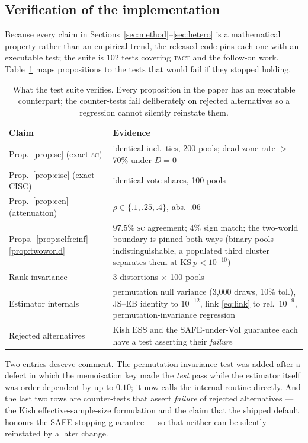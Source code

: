 \documentclass[twoside,11pt]{article}
\newcommand{\SC}{\textsc{sc}}
\newcommand{\TACT}{\textsc{tact}}
\begin{document}
\subsection{Verification of the implementation}\label{sec:tests}
Because every claim in Sections~\ref{sec:method}--\ref{sec:hetero} is a
mathematical property rather than an empirical trend, the released code pins
each one with an executable test; the suite is 102 tests covering \TACT{} and the
follow-on work. Table~\ref{tab:tests}
maps propositions to the tests that would fail if they stopped holding.

\begin{table}[t]
\centering
\caption{What the test suite verifies. Every proposition in the paper has an
executable counterpart; the counter-tests fail deliberately on rejected
alternatives so a regression cannot silently reinstate them.}
\label{tab:tests}
\setlength{\tabcolsep}{3.4pt}
\begin{tabular}{p{5.2cm} p{9.2cm}}
\toprule
Claim & Evidence \\
\midrule
Prop.~\ref{prop:sc} (exact \SC) & identical incl.\ ties, 200 pools; dead-zone rate $>$70\% under $D{=}0$ \\
Prop.~\ref{prop:cisc} (exact CISC) & identical vote shares, 100 pools \\
Prop.~\ref{prop:ccn} (attenuation) & $\rho\in\{.1,.25,.4\}$, abs.\ $.06$ \\
Props.~\ref{prop:selfreinf}--\ref{prop:twoworld} & 97.5\% \SC{} agreement; 4\% sign match; the two-world boundary is pinned both ways (binary pools indistinguishable, a populated third cluster separates them at $\mathrm{KS}\ p<10^{-10}$) \\
Rank invariance & 3 distortions $\times$ 100 pools \\
Estimator internals & permutation null variance (3{,}000 draws, 10\% tol.), JS--EB identity to $10^{-12}$, link \eqref{eq:link} to rel.\ $10^{-9}$, permutation-invariance regression \\
Rejected alternatives & Kish ESS and the SAFE-under-VoI guarantee each have a test asserting their \emph{failure} \\
\bottomrule
\end{tabular}
\end{table}

Two entries deserve comment. The permutation-invariance test was added after a
defect in which the memoisation key made the \emph{test} pass while the
estimator itself was order-dependent by up to $0.10$; it now calls the internal
routine directly. And the last two rows are counter-tests that assert
\emph{failure} of rejected alternatives --- the Kish effective-sample-size
formulation and the claim that the shipped default honours the SAFE stopping
guarantee --- so that neither can be silently reinstated by a later change.
\end{document}
